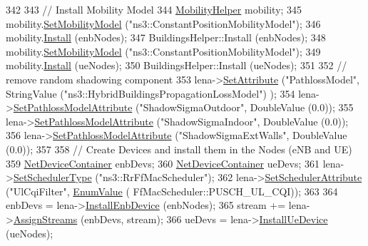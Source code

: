 \begin{DoxyCode}
342   
343   \textcolor{comment}{// Install Mobility Model}
344   \hyperlink{classns3_1_1MobilityHelper}{MobilityHelper} mobility;
345   mobility.\hyperlink{classns3_1_1MobilityHelper_a030275011b6f40682e70534d30280aba}{SetMobilityModel} (\textcolor{stringliteral}{"ns3::ConstantPositionMobilityModel"});
346   mobility.\hyperlink{classns3_1_1MobilityHelper_a07737960ee95c0777109cf2994dd97ae}{Install} (enbNodes);
347   BuildingsHelper::Install (enbNodes);
348   mobility.\hyperlink{classns3_1_1MobilityHelper_a030275011b6f40682e70534d30280aba}{SetMobilityModel} (\textcolor{stringliteral}{"ns3::ConstantPositionMobilityModel"});
349   mobility.\hyperlink{classns3_1_1MobilityHelper_a07737960ee95c0777109cf2994dd97ae}{Install} (ueNodes);
350   BuildingsHelper::Install (ueNodes);
351   
352   \textcolor{comment}{// remove random shadowing component}
353   lena->\hyperlink{classns3_1_1ObjectBase_ac60245d3ea4123bbc9b1d391f1f6592f}{SetAttribute} (\textcolor{stringliteral}{"PathlossModel"}, StringValue (\textcolor{stringliteral}{"ns3::HybridBuildingsPropagationLossModel"})
      );
354   lena->\hyperlink{classns3_1_1LteHelper_aa96ebbd6845ca61c2b5e08e84481a348}{SetPathlossModelAttribute} (\textcolor{stringliteral}{"ShadowSigmaOutdoor"}, DoubleValue (0.0));
355   lena->\hyperlink{classns3_1_1LteHelper_aa96ebbd6845ca61c2b5e08e84481a348}{SetPathlossModelAttribute} (\textcolor{stringliteral}{"ShadowSigmaIndoor"}, DoubleValue (0.0));
356   lena->\hyperlink{classns3_1_1LteHelper_aa96ebbd6845ca61c2b5e08e84481a348}{SetPathlossModelAttribute} (\textcolor{stringliteral}{"ShadowSigmaExtWalls"}, DoubleValue (0.0));
357   
358   \textcolor{comment}{// Create Devices and install them in the Nodes (eNB and UE)}
359   \hyperlink{classns3_1_1NetDeviceContainer}{NetDeviceContainer} enbDevs;
360   \hyperlink{classns3_1_1NetDeviceContainer}{NetDeviceContainer} ueDevs;
361   lena->\hyperlink{classns3_1_1LteHelper_a8f86e55b8b80a81732c4b2df00fb25d5}{SetSchedulerType} (\textcolor{stringliteral}{"ns3::RrFfMacScheduler"});
362   lena->\hyperlink{classns3_1_1LteHelper_a38f8c7f4592b31c0f3dedb53e7909742}{SetSchedulerAttribute} (\textcolor{stringliteral}{"UlCqiFilter"}, \hyperlink{classns3_1_1EnumValue}{EnumValue} (
      FfMacScheduler::PUSCH\_UL\_CQI));
363   
364   enbDevs = lena->\hyperlink{classns3_1_1LteHelper_a5e009ad35ef85f46b5a6099263f15a03}{InstallEnbDevice} (enbNodes);
365   stream += lena->\hyperlink{classns3_1_1LteHelper_ae90d941582aa49a1b28c9301ece35b07}{AssignStreams} (enbDevs, stream);
366   ueDevs = lena->\hyperlink{classns3_1_1LteHelper_ac9cd932d7de92811cfa953c2e3b2fc9f}{InstallUeDevice} (ueNodes);

\end{DoxyCode}
